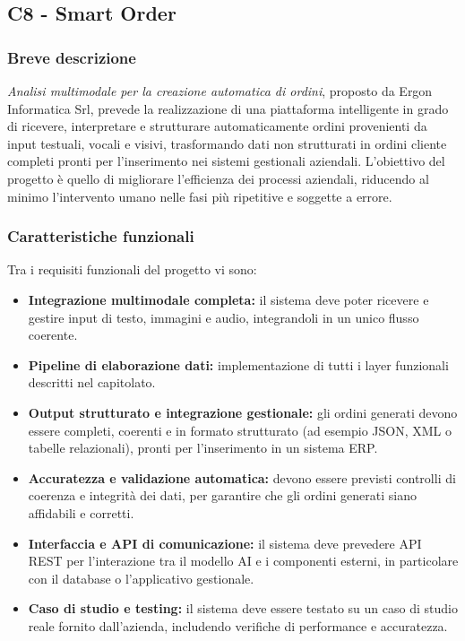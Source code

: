 \documentclass[a4paper,11pt]{article}
\begin{document}
\subsection{C8 - Smart Order}
\subsubsection{Breve descrizione}
\parbox[h]{\linewidth}{%
\textit{Analisi multimodale per la creazione automatica di
ordini}, proposto da Ergon Informatica Srl, prevede la realizzazione di una
piattaforma intelligente in grado di ricevere, interpretare e strutturare
automaticamente ordini provenienti da input testuali, vocali e visivi, trasformando
dati non strutturati in ordini cliente completi pronti per l'inserimento nei sistemi
gestionali aziendali. L'obiettivo del progetto è quello di migliorare l'efficienza dei
processi aziendali, riducendo al minimo l'intervento umano nelle fasi più ripetitive
e soggette a errore.
}

\subsubsection{Caratteristiche funzionali}
Tra i requisiti funzionali del progetto vi sono:
\begin{itemize}
  \item \textbf{Integrazione multimodale completa:} il sistema deve poter ricevere e gestire input di testo, immagini e audio, integrandoli in un unico flusso coerente.
  \item \textbf{Pipeline di elaborazione dati:} implementazione di tutti i layer funzionali descritti nel capitolato.
  \item \textbf{Output strutturato e integrazione gestionale:} gli ordini generati devono essere completi, coerenti e in formato strutturato (ad esempio JSON, XML o tabelle relazionali), pronti per l'inserimento in un sistema ERP.
  \item \textbf{Accuratezza e validazione automatica:} devono essere previsti controlli di coerenza e integrità dei dati, per garantire che gli ordini generati siano affidabili e corretti.
  \item \textbf{Interfaccia e API di comunicazione:} il sistema deve prevedere API REST per l'interazione tra il modello AI e i componenti esterni, in particolare con il database o l'applicativo gestionale.
  \item \textbf{Caso di studio e testing:} il sistema deve essere testato su un caso di studio reale fornito dall'azienda, includendo verifiche di performance e accuratezza.
\end{itemize}
\end{document}
